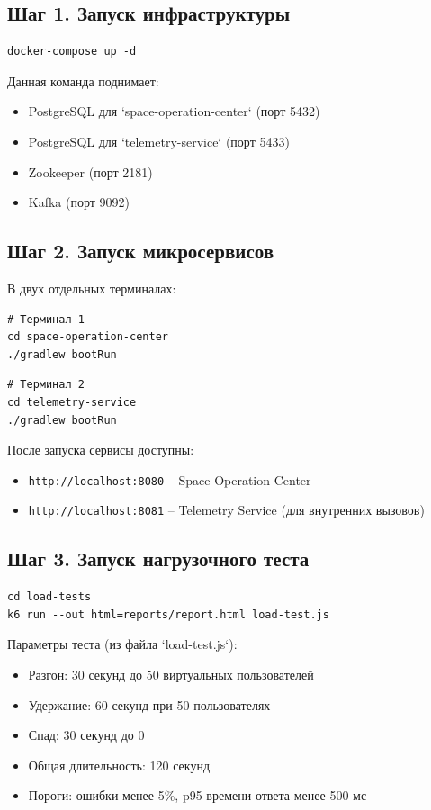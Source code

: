 \documentclass[12pt,a4paper]{article}
\begin{document}
\subsection{Шаг 1. Запуск инфраструктуры}
\begin{lstlisting}[style=shellstyle]
docker-compose up -d
\end{lstlisting}
Данная команда поднимает:
\begin{itemize}
    \item PostgreSQL для `space-operation-center` (порт 5432)
    \item PostgreSQL для `telemetry-service` (порт 5433)
    \item Zookeeper (порт 2181)
    \item Kafka (порт 9092)
\end{itemize}

\subsection{Шаг 2. Запуск микросервисов}
В двух отдельных терминалах:
\begin{lstlisting}[style=shellstyle]
# Терминал 1
cd space-operation-center
./gradlew bootRun
\end{lstlisting}
\begin{lstlisting}[style=shellstyle]
# Терминал 2
cd telemetry-service
./gradlew bootRun
\end{lstlisting}
После запуска сервисы доступны:
\begin{itemize}
    \item \texttt{http://localhost:8080} – Space Operation Center
    \item \texttt{http://localhost:8081} – Telemetry Service (для внутренних вызовов)
\end{itemize}

\subsection{Шаг 3. Запуск нагрузочного теста}
\begin{lstlisting}[style=shellstyle]
cd load-tests
k6 run --out html=reports/report.html load-test.js
\end{lstlisting}
Параметры теста (из файла `load-test.js`):
\begin{itemize}
    \item Разгон: 30 секунд до 50 виртуальных пользователей
    \item Удержание: 60 секунд при 50 пользователях
    \item Спад: 30 секунд до 0
    \item Общая длительность: 120 секунд
    \item Пороги: ошибки менее 5\%, p95 времени ответа менее 500 мс
\end{itemize}
\end{document}
